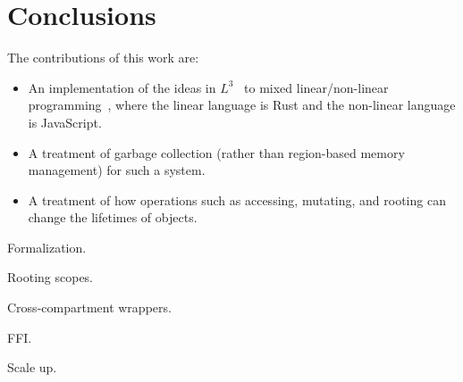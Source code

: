 \section{Conclusions}

The contributions of this work are:
\begin{itemize}

\item An implementation of the ideas in $L^3$~\cite{l3} to mixed
  linear/non-linear programming~\cite{mixed}, where the
  linear language is Rust and the non-linear language is
  JavaScript.

\item A treatment of garbage collection (rather than region-based
  memory management) for such a system.

\item A treatment of how operations such as accessing, mutating, and
  rooting can change the lifetimes of objects.
  
\end{itemize}

Formalization.

Rooting scopes.

Cross-compartment wrappers.

FFI.

Scale up.
